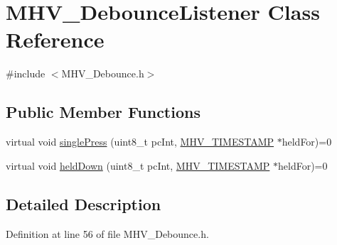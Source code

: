 \hypertarget{class_m_h_v___debounce_listener}{
\section{\-M\-H\-V\-\_\-\-Debounce\-Listener \-Class \-Reference}
\label{class_m_h_v___debounce_listener}
}


{\ttfamily \#include $<$\-M\-H\-V\-\_\-\-Debounce.\-h$>$}

\subsection*{\-Public \-Member \-Functions}
\begin{DoxyCompactItemize}
\item 
virtual void \hyperlink{class_m_h_v___debounce_listener_a8d60b331345e88871540f6665486b700}{single\-Press} (uint8\-\_\-t pc\-Int, \hyperlink{_m_h_v___r_t_c_8h_a1e30d3a92b1b868286bd0d619245d8a6}{\-M\-H\-V\-\_\-\-T\-I\-M\-E\-S\-T\-A\-M\-P} $\ast$held\-For)=0
\item 
virtual void \hyperlink{class_m_h_v___debounce_listener_a21c51f319ccc9901f68ca410ddbb1e59}{held\-Down} (uint8\-\_\-t pc\-Int, \hyperlink{_m_h_v___r_t_c_8h_a1e30d3a92b1b868286bd0d619245d8a6}{\-M\-H\-V\-\_\-\-T\-I\-M\-E\-S\-T\-A\-M\-P} $\ast$held\-For)=0
\end{DoxyCompactItemize}


\subsection{\-Detailed \-Description}


\-Definition at line 56 of file \-M\-H\-V\-\_\-\-Debounce.\-h.



